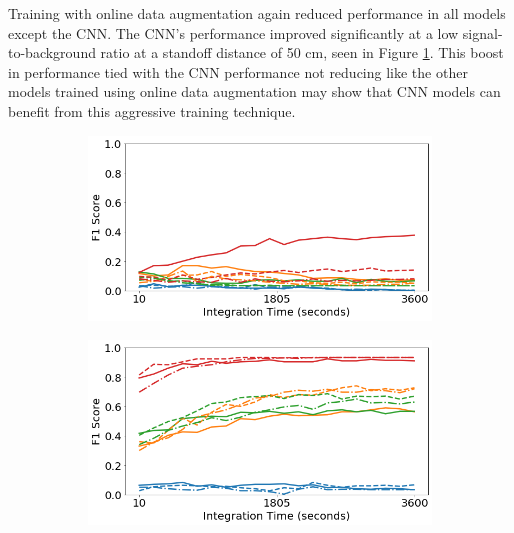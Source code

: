 Training with online data augmentation again reduced performance in all models except the CNN. The CNN's performance improved significantly at a low signal-to-background ratio at a standoff distance of 50 cm, seen in Figure \ref{fig:generalization-dist-aug-easy-01}. This boost in performance tied with the CNN performance not reducing like the other models trained using online data augmentation may show that CNN models can benefit from this aggressive training technique. 


\begin{figure}[H]
     \centering
     \begin{subfigure}[b]{0.49\textwidth}
         \centering
         \includegraphics[width=\textwidth]{images/generalization-dist-aug-easy-01.png}
         \caption{}
         \label{fig:generalization-dist-aug-easy-01}
     \end{subfigure}
     \hfill
     \begin{subfigure}[b]{0.49\textwidth}
         \centering
         \includegraphics[width=\textwidth]{images/generalization-dist-aug-easy-05.png}
         \caption{}
         \label{fig:generalization-dist-aug-easy-05}
     \end{subfigure}


\end{figure}
